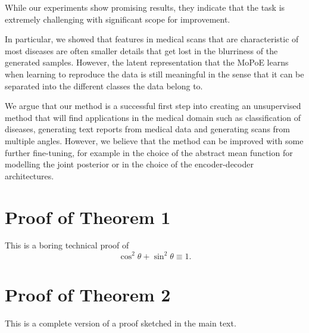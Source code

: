 \documentclass{midl} %
\begin{document}
    While our experiments show promising results, they indicate that the task is extremely challenging with significant scope for improvement.
    
    In particular, we showed that features in medical scans that are characteristic of most diseases are often smaller details that get lost in the blurriness of the generated samples.
    However, the latent representation that the MoPoE learns when learning to reproduce the data is still meaningful in the sense that it can be separated into the different classes the data belong to.

    We argue that our method is a successful first step into creating an unsupervised method that will find applications in the medical domain such as classification of diseases, generating text reports from medical data and generating scans from multiple angles.
    However, we believe that the method can be improved with some further fine-tuning, for example in the choice of the abstract mean function for modelling the joint posterior or in the choice of the encoder-decoder architectures.







\appendix

\section{Proof of Theorem 1}

This is a boring technical proof of
\begin{equation}\label{eq:example}
\cos^2\theta + \sin^2\theta \equiv 1.
\end{equation}

\section{Proof of Theorem 2}

This is a complete version of a proof sketched in the main text.
\end{document}
